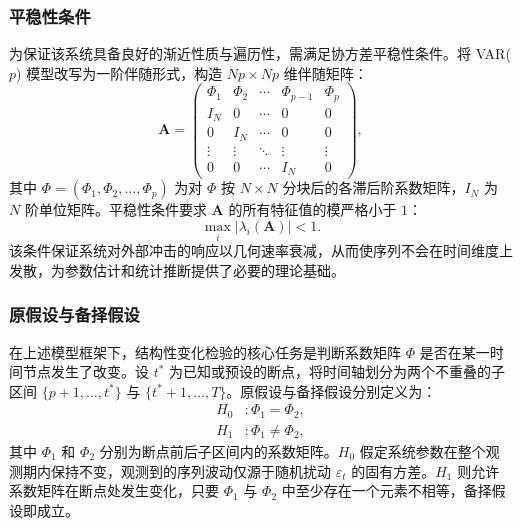 \subsubsection{平稳性条件}

为保证该系统具备良好的渐近性质与遍历性，需满足协方差平稳性条件。将 VAR($p$) 模型改写为一阶伴随形式，构造 $Np \times Np$ 维伴随矩阵：
\begin{equation}\label{eq:companion}
    \mathbf{A} =
    \begin{pmatrix}
        \Phi_1     & \Phi_2     & \cdots & \Phi_{p-1} & \Phi_p     \\
        I_N        & 0          & \cdots & 0          & 0          \\
        0          & I_N        & \cdots & 0          & 0          \\
        \vdots     & \vdots     & \ddots & \vdots     & \vdots     \\
        0          & 0          & \cdots & I_N        & 0
    \end{pmatrix},
\end{equation}
其中 $\Phi = (\Phi_1, \Phi_2, \ldots, \Phi_p)$ 为对 $\Phi$ 按 $N \times N$ 分块后的各滞后阶系数矩阵，$I_N$ 为 $N$ 阶单位矩阵。平稳性条件要求 $\mathbf{A}$ 的所有特征值的模严格小于 $1$：
\begin{equation}\label{eq:stationarity}
    \max_i |\lambda_i(\mathbf{A})| < 1.
\end{equation}
该条件保证系统对外部冲击的响应以几何速率衰减，从而使序列不会在时间维度上发散，为参数估计和统计推断提供了必要的理论基础。

\subsubsection{原假设与备择假设}

在上述模型框架下，结构性变化检验的核心任务是判断系数矩阵 $\Phi$ 是否在某一时间节点发生了改变。设 $t^*$ 为已知或预设的断点，将时间轴划分为两个不重叠的子区间 $\{p+1, \ldots, t^*\}$ 与 $\{t^*+1, \ldots, T\}$。原假设与备择假设分别定义为：
\begin{align}
    H_0 &: \Phi_1 = \Phi_2, \label{eq:h0} \\
    H_1 &: \Phi_1 \neq \Phi_2, \label{eq:h1}
\end{align}
其中 $\Phi_1$ 和 $\Phi_2$ 分别为断点前后子区间内的系数矩阵。$H_0$ 假定系统参数在整个观测期内保持不变，观测到的序列波动仅源于随机扰动 $\varepsilon_t$ 的固有方差。$H_1$ 则允许系数矩阵在断点处发生变化，只要 $\Phi_1$ 与 $\Phi_2$ 中至少存在一个元素不相等，备择假设即成立。

